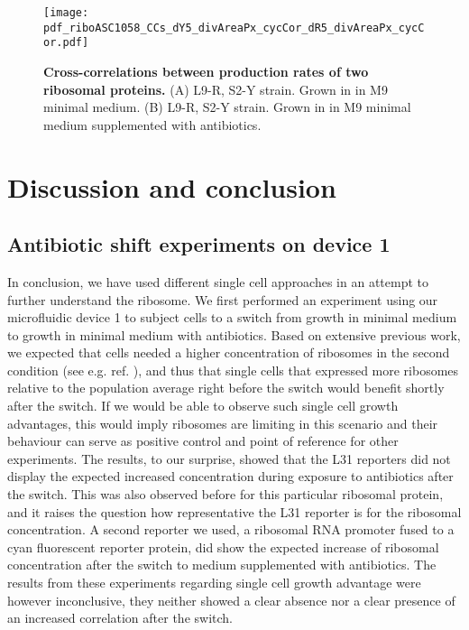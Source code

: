 \begin{figure}
    \centering
    \texttt{[image: pdf\_riboASC1058\_CCs\_dY5\_divAreaPx\_cycCor\_dR5\_divAreaPx\_cycCor.pdf]}
    \caption{ 
        \textbf{Cross-correlations between production rates of two ribosomal proteins.}
        (A) L9-R, S2-Y strain. Grown in in M9 minimal medium.
        (B) L9-R, S2-Y strain. Grown in in M9 minimal medium supplemented with antibiotics.
    }
    \label{fig:ribo:CCsPPRiboribo}
\end{figure}




\section{Discussion and conclusion}


\subsection{Antibiotic shift experiments on device 1}

In conclusion, we have used different single cell approaches in an attempt to further understand the ribosome.
%
We first performed an experiment using our microfluidic device 1 to subject cells to a switch from growth in minimal medium to growth in minimal medium with antibiotics.
Based on extensive previous work, we expected that cells needed a higher concentration of ribosomes in the second condition (see e.g. ref. \cite{You2013}), and thus that single cells that expressed more ribosomes relative to the population average right before the switch would benefit shortly after the switch.
%
If we would be able to observe such single cell growth advantages, this would imply 
ribosomes are limiting in this scenario and their behaviour can serve 
as positive control and point of reference for other experiments. 
%
The results, to our surprise, showed that the L31 reporters did not display the expected increased concentration during exposure to antibiotics after the switch.
%
This was also observed before \cite{Walker2016t} for this particular ribosomal protein, and it
raises the question how representative the L31 reporter is for the ribosomal concentration.
%
A second reporter we used, a ribosomal RNA promoter fused to a cyan fluorescent reporter protein, did show the expected increase of ribosomal concentration after the switch to medium supplemented with antibiotics.
%
The results from these experiments regarding single cell growth advantage were however inconclusive, they neither showed a clear absence nor a clear presence of an increased correlation after the switch.

